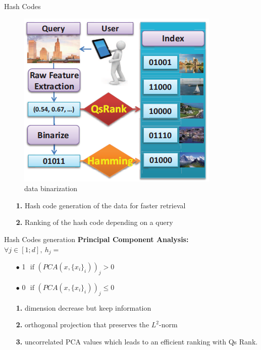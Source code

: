 \documentclass[english]{beamer}
\theoremstyle{plain}
\theoremstyle{remark}
\begin{document}
\begin{frame}{Hash Codes}

\begin{figure}[htbp]
	\begin{center}
	\includegraphics[width=.5\linewidth]{Images/intro2.png}
	\caption{data binarization}
	\end{center}
	\label{fig:intro2}
\end{figure}
\begin{itemize}
	\item[\textbf{1.}] Hash code generation of the data for faster retrieval
	\item[\textbf{2.}] Ranking of the hash code depending on a query
\end{itemize}

\end{frame}

\begin{frame}{Hash Codes generation}
\textbf{Principal Component Analysis:}\\
\vspace{1em}
$\forall j \in [1;d],\ h_j = $	
\begin{itemize}
    \item[$\bullet$]1 $\text{ if }(PCA(x, \{x_i\}_i))_j > 0$
    \item[$\bullet$]0 $\text{ if }(PCA(x, \{x_i\}_i))_j \leq 0$
\end{itemize}
\vspace{1em}
\begin{itemize}
	\item[\textbf{1.}]dimension decrease but keep information
	\item[\textbf{2.}]orthogonal projection that preserves the $L^2$-norm
	\item[\textbf{3.}]uncorrelated PCA values which leads to an efficient ranking with Qs Rank.
\end{itemize}
\end{frame}
\end{document}
